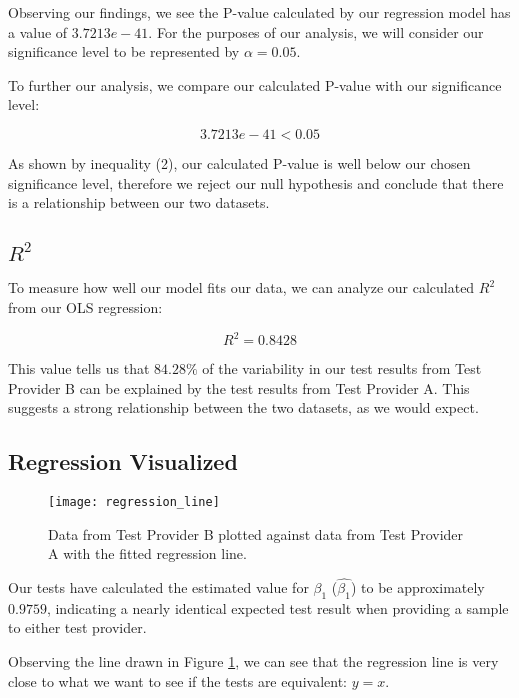 \documentclass{article}
\begin{document}
  Observing our findings, we see the P-value calculated by our regression model has a value of $3.7213e-41$. For the purposes of our analysis, we will consider our significance level to be represented by $\alpha=0.05$.

  To further our analysis, we compare our calculated P-value with our significance level:

  \begin{equation}
    3.7213e-41<0.05
  \end{equation}

  As shown by inequality (2), our calculated P-value is well below our chosen significance level, therefore we reject our null hypothesis and conclude that there is a relationship between our two datasets.



  \subsection{$R^2$}

  To measure how well our model fits our data, we can analyze our calculated $R^2$ from our OLS regression:

  \begin{equation}
    R^2=0.8428
  \end{equation}

  This value tells us that $84.28\%$ of the variability in our test results from Test Provider B can be explained by the test results from Test Provider A. This suggests a strong relationship between the two datasets, as we would expect.



  \subsection{Regression Visualized}

  \begin{figure}[htbp]
    \centering
    \texttt{[image: regression\_line]}
    \caption{Data from Test Provider B plotted against data from Test Provider A with the fitted regression line.}
    \label{fig:regression_line}
  \end{figure}

  Our tests have calculated the estimated value for $\beta_1$ ($\hat{\beta_1}$) to be approximately $0.9759$, indicating a nearly identical expected test result when providing a sample to either test provider.

  Observing the line drawn in Figure \ref{fig:regression_line}, we can see that the regression line is very close to what we want to see if the tests are equivalent: $y=x$.
\end{document}
